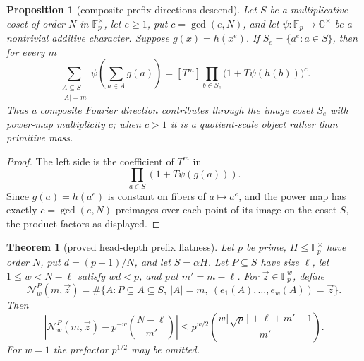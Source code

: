 \documentclass[a4paper,11pt]{amsart}
\newtheorem{theorem}{Theorem}[section]
\newtheorem{proposition}[proposition]{Proposition}
\theoremstyle{remark}
\newcommand{\F}{\mathbb F}
\begin{document}
\begin{proposition}[composite prefix directions descend]\label{prop:composite-descend}
Let \(S\) be a multiplicative coset of order \(N\) in \(\F_p^\times\), let \(e\ge1\), put \(c=\gcd(e,N)\), and let \(\psi:\F_p\to\mathbb C^\times\) be a nontrivial additive character.  Suppose \(g(x)=h(x^e)\).  If \(S_e=\{a^e:a\in S\}\), then for every \(m\)
\[
        \sum_{\substack{A\subseteq S\\ |A|=m}}
        \psi\!\left(\sum_{a\in A}g(a)\right)
        =
        [T^m]\prod_{b\in S_e}\bigl(1+T\psi(h(b))\bigr)^c .
\]
Thus a composite Fourier direction contributes through the image coset \(S_e\)
with power-map multiplicity \(c\); when \(c>1\) it is a quotient-scale object
rather than primitive mass.
\end{proposition}

\begin{proof}
The left side is the coefficient of \(T^m\) in
\[
        \prod_{a\in S}(1+T\psi(g(a))).
\]
Since \(g(a)=h(a^e)\) is constant on fibers of \(a\mapsto a^e\), and the power map has exactly \(c=\gcd(e,N)\) preimages over each point of its image on the coset \(S\), the product factors as displayed.
\end{proof}

\begin{theorem}[proved head-depth prefix flatness]\label{thm:head-flatness}
Let \(p\) be prime, \(H\le\F_p^\times\) have order \(N\), put \(d=(p-1)/N\), and let \(S=\alpha H\).  Let \(P\subseteq S\) have size \(\ell\), let \(1\le w<N-\ell\) satisfy \(wd<p\), and put \(m'=m-\ell\).  For \(\vec z\in\F_p^w\), define
\[
        \mathcal N_w^P(m,\vec z)=
        \#\{A:P\subseteq A\subseteq S,\ |A|=m,\ (e_1(A),\ldots,e_w(A))=\vec z\}.
\]
Then
\[
        \left|\mathcal N_w^P(m,\vec z)-p^{-w}\binom{N-\ell}{m'}\right|
        \le
        p^{w/2}\binom{w\lceil\sqrt p\rceil+\ell+m'-1}{m'} .
\]
For \(w=1\) the prefactor \(p^{1/2}\) may be omitted.
\end{theorem}
\end{document}
